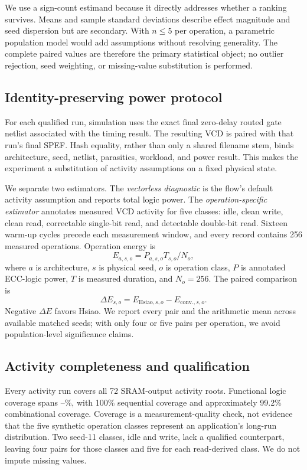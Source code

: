 \documentclass[conference,10pt]{IEEEtran}
\begin{document}
We use a sign-count estimand because it directly addresses whether a ranking survives. Means and sample standard deviations describe effect magnitude and seed dispersion but are secondary. With $n\leq5$ per operation, a parametric population model would add assumptions without resolving generality. The complete paired values are therefore the primary statistical object; no outlier rejection, seed weighting, or missing-value substitution is performed.

\subsection{Identity-preserving power protocol}
For each qualified run, simulation uses the exact final zero-delay routed gate netlist associated with the timing result. The resulting VCD is paired with that run's final SPEF. Hash equality, rather than only a shared filename stem, binds architecture, seed, netlist, parasitics, workload, and power result. This makes the experiment a substitution of activity assumptions on a fixed physical state.

We separate two estimators. The \emph{vectorless diagnostic} is the flow's default activity assumption and reports total logic power. The \emph{operation-specific estimator} annotates measured VCD activity for five classes: idle, clean write, clean read, correctable single-bit read, and detectable double-bit read. Sixteen warm-up cycles precede each measurement window, and every record contains 256 measured operations. Operation energy is
\begin{equation}
  E_{a,s,o}=P_{a,s,o}T_{s,o}/N_o,
\end{equation}
where $a$ is architecture, $s$ is physical seed, $o$ is operation class, $P$ is annotated ECC-logic power, $T$ is measured duration, and $N_o=256$. The paired comparison is
\begin{equation}
  \Delta E_{s,o}=E_{\mathrm{Hsiao},s,o}-E_{\mathrm{conv.},s,o}.
\end{equation}
Negative $\Delta E$ favors Hsiao. We report every pair and the arithmetic mean across available matched seeds; with only four or five pairs per operation, we avoid population-level significance claims.

\subsection{Activity completeness and qualification}
Every activity run covers all 72 SRAM-output activity roots. Functional logic coverage spans \CoverageMin--\CoverageMax\%, with 100\% sequential coverage and approximately 99.2\% combinational coverage. Coverage is a measurement-quality check, not evidence that the five synthetic operation classes represent an application's long-run distribution. Two seed-11 classes, idle and write, lack a qualified counterpart, leaving four pairs for those classes and five for each read-derived class. We do not impute missing values.
\end{document}
